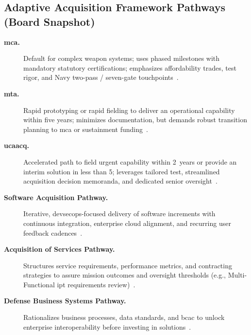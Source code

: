 \documentclass[../main.tex]{subfiles}
\begin{document}
\subsection{Adaptive Acquisition Framework Pathways (Board Snapshot)}
\begin{description}
	\item[\textbf{\ac{mca}.}] Default for complex weapon systems; uses phased milestones with mandatory statutory certifications; emphasizes affordability trades, test rigor, and Navy two-pass / seven-gate touchpoints~\autocite{DoDI5000-85}.
	\item[\textbf{\ac{mta}.}] Rapid prototyping or rapid fielding to deliver an operational capability within five years; minimizes documentation, but demands robust transition planning to \ac{mca} or sustainment funding~\autocite{DoDI5000-80}.
	\item[\textbf{\ac{ucaacq}.}] Accelerated path to field urgent capability within 2~years or provide an interim solution in less than 5; leverages tailored test, streamlined acquisition decision memoranda, and dedicated senior oversight~\autocite{DoDI5000-81}.
	\item[\textbf{Software Acquisition Pathway.}] Iterative, \ac{devsecops}-focused delivery of software increments with continuous integration, enterprise cloud alignment, and recurring user feedback cadences~\autocite{DoDI5000-87}.
\item[\textbf{Acquisition of Services Pathway.}] Structures service requirements, performance metrics, and contracting strategies to assure mission outcomes and oversight thresholds (e.g., Multi-Functional \ac{ipt} requirements review)~\autocite{DoDI5000-74}.
	\item[\textbf{Defense Business Systems Pathway.}] Rationalizes business processes, data standards, and \ac{bcac} to unlock enterprise interoperability before investing in solutions~\autocite{DoDI5000-75}.
\end{description}
\end{document}
